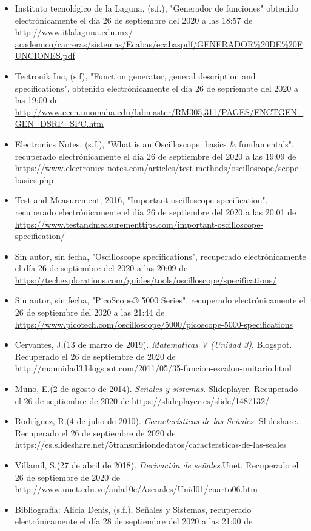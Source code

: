 \documentclass[10pt]{article}
\begin{document}
\begin{itemize}
	\item Instituto tecnológico de la Laguna, (s.f.), "Generador de funciones" obtenido electrónicamente el día 26 de septiembre del 2020 a las 18:57 de \url{http://www.itlalaguna.edu.mx/
		academico/carreras/sistemas/Ecabas/ecabaspdf/GENERADOR\%20DE\%20FUNCIONES.pdf}
	\item Tectronik Inc, (s.f), "Function generator, general description and specifications", obtenido electrónicamente el día 26 de sepriembte del 2020 a las 19:00 de \url{http://www.ceen.unomaha.edu/labmaster/RM305,311/PAGES/FNCTGEN_GEN_DSRP_SPC.htm}
	\item Electronics Notes, (s.f.), "What is an Oscilloscope: basics \& fundamentals", recuperado electrónicamente el día 26 de septiembre del 2020 a las 19:09 de \url{https://www.electronics-notes.com/articles/test-methods/oscilloscope/scope-basics.php}
	\item Test and Measurement, 2016, "Important oscilloscope specification", recuperado electrónicamente el día 26 de septiembre del 2020 a las 20:01 de \\ \url{https://www.testandmeasurementtips.com/important-oscilloscope-specification/}
	\item Sin autor, sin fecha, "Oscilloscope specifications", recuperado electrónicamente el día 26 de septiembre del 2020 a las 20:09 de \url{https://techexplorations.com/guides/tools/oscilloscope/specifications/}
	\item Sin autor, sin fecha, "PicoScope® 5000 Series", recuperado electrónicamente el 26 de septiembre del 2020 a las 21:44 de \url{https://www.picotech.com/oscilloscope/5000/picoscope-5000-specifications}
	\item 	Cervantes, J.(13 de marzo de 2019).\textit{ Matematicas V (Unidad 3)}. Blogspot. Recuperado el 26 de septiembre de 2020 de http://maunidad3.blogspot.com/2011/05/35-funcion-escalon-unitario.html\\
	
	\item Muno, E.(2 de agosto de 2014).\textit{ Señales y sistemas}. Slideplayer. Recuperado el 26 de septiembre de 2020 de https://slideplayer.es/slide/1487132/\\
	
	\item Rodríguez, R.(4 de julio de 2010).\textit{ Características de las Señales}. Slideshare. Recuperado el 26 de septiembre de 2020 de https://es.slideshare.net/5transmisiondedatos/caractersticas-de-las-seales\\
	
	\item Villamil, S.(27 de abril de 2018).\textit{ Derivación de señales}.Unet. Recuperado el 26 de septiembre de 2020 de http://www.unet.edu.ve/aula10c/Asenales/Unid01/cuarto06.htm
	
	\item Bibliografía: Alicia Denis, (s.f.), Señales y Sistemas, recuperado electrónicamente el día 28 de septiembre del 2020 a las 21:00 de 
\end{itemize}
\end{document}
